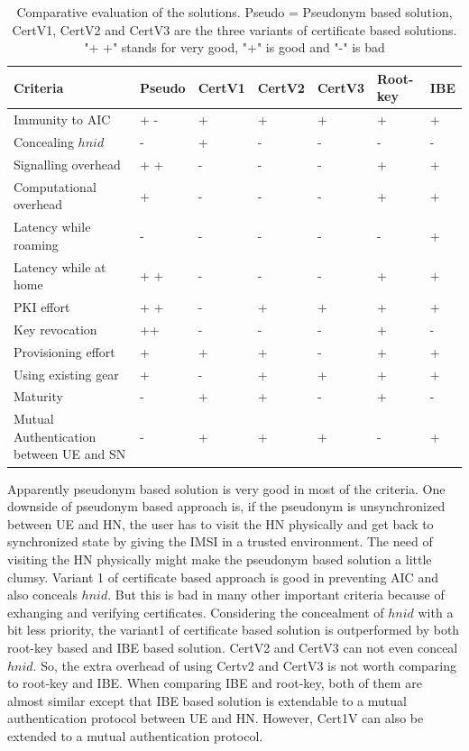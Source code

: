 \documentclass[runningheads,a4paper]{llncs} %
\begin{document}
\begin{table}
\begin{center}
\begin{tabular}{ |p{3.5cm}|P{1.25cm}|P{1.25cm}|P{1.25cm}|P{1.25cm}|P{1.5cm}| P{1cm} | }
\hline
\textbf{Criteria} & \textbf{Pseudo} & \textbf{CertV1} & \textbf{CertV2} & \textbf{CertV3} & \textbf{Root-key} & \textbf{IBE}\\
\hline \hline
Immunity to AIC & + - & + & + & + & + & + \\ \hline
Concealing $hnid$ & - & + & - & - & - & - \\ \hline
Signalling overhead & + + & - & - & - & + & + \\ \hline
Computational overhead & + & - & - & - & + & + \\ \hline
Latency while roaming & - & - & -  & - & - & + \\ \hline
Latency while at home & + + & - & -  & - & + & + \\ \hline
PKI effort & + + &  - & + & + & + & + \\ \hline
Key revocation & ++ & - & - & - & + & - \\ \hline
Provisioning effort & + & + & + & - & + & + \\ \hline
Using existing gear & + & - & + & + & + & + \\ \hline
Maturity  & - & + & + & - & + & - \\ \hline
Mutual Authentication between UE and SN & - & + & + & + & - & + \\ \hline
\end{tabular}
\vspace{5pt}
\caption{Comparative evaluation of the solutions. Pseudo = Pseudonym based solution, CertV1, CertV2 and CertV3 are the three variants of certificate based solutions. "+ +" stands for very good, "+" is good and "-" is bad}
\label{table:comparison}
\end{center}
\end{table}

Apparently pseudonym based solution is very good in most of the criteria. One downside of pseudonym based approach is, if the pseudonym is unsynchronized between UE and HN, the user has to visit the HN physically and get back to synchronized state by giving the IMSI in a trusted environment. The need of visiting the HN physically might make the pseudonym based solution a little clumsy. Variant 1 of certificate based approach is good in preventing AIC and also conceals $hnid$. But this is bad in many other important criteria because of exhanging and verifying certificates. Considering the concealment of $hnid$ with a bit less priority, the variant1 of certificate based solution is outperformed by both root-key based and IBE based solution. CertV2 and CertV3 can not even conceal $hnid$. So, the extra overhead of using Certv2 and CertV3 is not worth comparing to root-key and IBE. When comparing IBE and root-key, both of them are almost similar except that IBE based solution is extendable to a mutual authentication protocol between UE and HN. However, Cert1V can also be extended to a mutual authentication protocol. 
\end{document}
